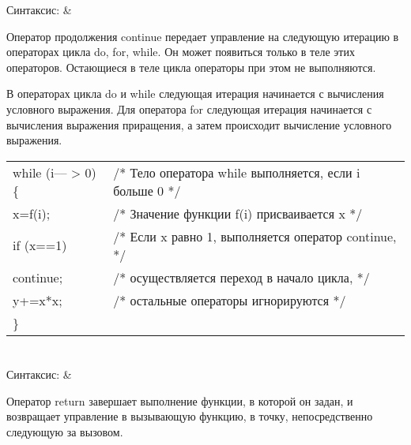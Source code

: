 \begin{pHeader}
Синтаксис:      & \\
\end{pHeader}

Оператор продолжения continue передает управление на следующую итерацию в операторах цикла do, for, while. Он может появиться только в теле этих операторов. Остающиеся в теле цикла операторы при этом не выполняются. \killoverfullbefore

В операторах цикла do и while следующая итерация начинается с вычисления условного выражения. Для оператора for следующая итерация начинается с вычисления выражения приращения, а затем происходит вычисление условного выражения. \killoverfullbefore \BL

\begin{pExample}
\begin{tabular}{ l l }
 while (i{--}{--} > 0) \{ & \textcolor{exComm}{/* Тело оператора while выполняется, если i больше 0 */} \\
\indent x=f(i);  & \textcolor{exComm}{/* Значение функции f(i) присваивается x */} \\
\indent if (x==1) & \textcolor{exComm}{/* Если x равно 1, выполняется оператор continue,    */} \\
\indent \indent continue; & \textcolor{exComm}{/* осуществляется переход в начало цикла, */} \\
\indent y+=x*x; & \textcolor{exComm}{/* остальные операторы игнорируются */} \\
\} & \textcolor{exComm}{} \\
\end{tabular}
\end{pExample}

\section{}

\begin{pHeader}
Синтаксис:      & \\
\end{pHeader}

Оператор return завершает выполнение функции, в которой он задан, и возвращает управление в вызывающую функцию, в точку, непосредственно следующую за вызовом. \killoverfullbefore

